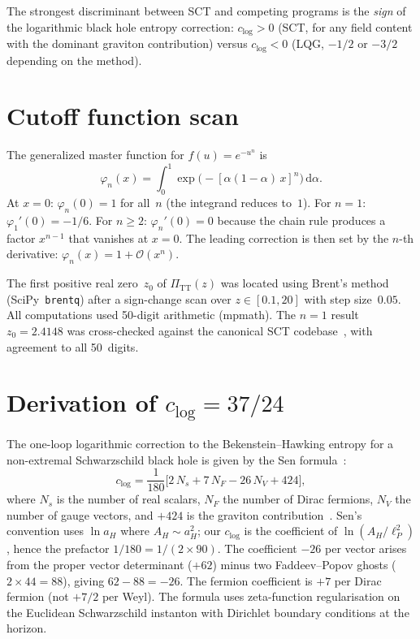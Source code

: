 \documentclass[12pt,a4paper]{article}
\theoremstyle{plain}
\theoremstyle{definition}
\theoremstyle{remark}
\newcommand{\dd}{\mathrm{d}}
\newcommand{\order}{\mathcal{O}}
\begin{document}
The strongest discriminant between SCT and competing programs is
the \emph{sign} of the logarithmic black hole entropy correction:
$c_{\log} > 0$ (SCT, for any field content with the dominant
graviton contribution) versus $c_{\log} < 0$ (LQG, $-1/2$ or
$-3/2$ depending on the method).

\appendix
\section{Cutoff function scan}
\label{app:cutoff}

The generalized master function for $f(u) = e^{-u^n}$ is
\begin{equation}\label{eq:phi-n-app}
  \varphi_n(x) = \int_0^1
  \exp\bigl(-[\alpha(1-\alpha)\, x]^n\bigr)\, \dd\alpha.
\end{equation}
At $x = 0$: $\varphi_n(0) = 1$ for all~$n$ (the integrand
reduces to~$1$).  For $n = 1$: $\varphi_1'(0) = -1/6$.  For
$n \geq 2$: $\varphi_n'(0) = 0$ because the chain rule produces
a factor $x^{n-1}$ that vanishes at $x = 0$.  The leading
correction is then set by the $n$-th derivative:
$\varphi_n(x) = 1 + \order(x^n)$.

The first positive real zero~$z_0$ of
$\Pi_{\mathrm{TT}}(z)$ was located using Brent's method
(SciPy~\texttt{brentq}) after a sign-change scan over
$z \in [0.1, 20]$ with step size~$0.05$.  All computations
used 50-digit arithmetic (mpmath).  The $n = 1$ result
$z_0 = 2.4148$ was cross-checked against the canonical SCT
codebase~\cite{Alfyorov:2026repo}, with agreement to all
50~digits.

\section{Derivation of $c_{\log} = 37/24$}
\label{app:clog}

The one-loop logarithmic correction to the Bekenstein--Hawking
entropy for a non-extremal Schwarzschild black hole is given by
the Sen formula~\cite{Sen:2012}:
\begin{equation}\label{eq:sen-formula}
  c_{\log} = \frac{1}{180}\bigl[
  2\,N_s + 7\,N_F - 26\,N_V + 424\bigr],
\end{equation}
where $N_s$ is the number of real scalars, $N_F$ the number of
Dirac fermions, $N_V$ the number of gauge vectors, and
$+424$ is the graviton contribution~\cite{Sen:2012}.
Sen's convention uses $\ln a_H$ where $A_H \sim a_H^2$; our
$c_{\log}$ is the coefficient of $\ln(A_H/\ell_P^2)$, hence the
prefactor $1/180 = 1/(2 \times 90)$.  The
coefficient $-26$ per vector arises from the proper vector
determinant ($+62$) minus two Faddeev--Popov ghosts
($2 \times 44 = 88$), giving $62 - 88 = -26$.  The fermion
coefficient is $+7$ per Dirac fermion (not $+7/2$ per Weyl).
The formula uses zeta-function regularisation on the Euclidean
Schwarzschild instanton with Dirichlet boundary conditions at
the horizon.
\end{document}

